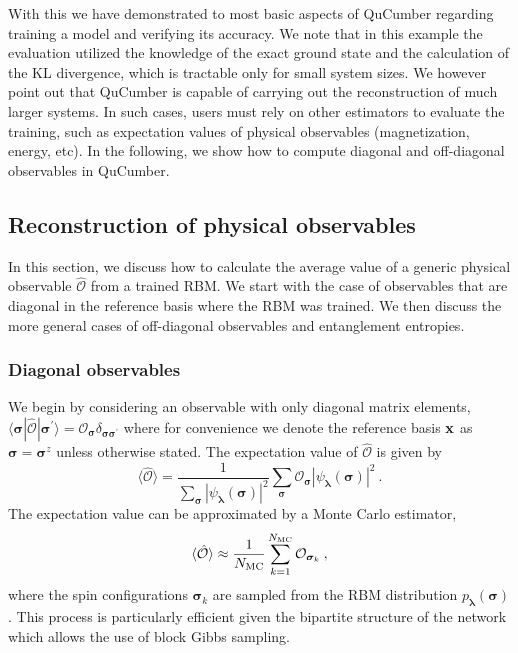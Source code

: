\documentclass[submission, Phys, hidelnks]{SciPost}
\begin{document}
With this we have demonstrated to most basic aspects of QuCumber regarding training a model and verifying its accuracy. We note that in this example the evaluation utilized the knowledge of the exact ground state and the calculation of the KL divergence, which is tractable only for small system sizes.  We however point out that QuCumber is capable of carrying out the reconstruction of much larger systems. In such cases, users must rely on other estimators to evaluate the training, such as 
expectation values of physical observables (magnetization, energy, etc).
In the following, we show how to compute diagonal and off-diagonal observables in QuCumber. 

\subsection{Reconstruction of physical observables} \label{Sec:Sampling_a-Trained_RBM}
In this section, we discuss how to calculate the average value of a generic physical observable $\hat{\mathcal{O}}$ from a trained RBM. We start with the case of observables that are diagonal in the reference basis where the RBM was trained. We then discuss the more general cases of off-diagonal observables and entanglement entropies.

\subsubsection{Diagonal observables}
We begin by considering an observable with only diagonal matrix elements,
$\langle\bm{\sigma}|\hat{\mathcal{O}}|\bm{\sigma}^{\prime}\rangle=\mathcal{O}_{\bm{\sigma}}\delta_{\bm{\sigma\sigma}^\prime}$ where for convenience we denote the reference basis ${\bf x}$ as $\bm{\sigma}=\bm{\sigma}^z$ unless otherwise stated.
The expectation value of $\hat{\mathcal{O}}$ is given by
\begin{equation}
    \langle \hat{\mathcal{O}} \rangle = \frac{1}{\sum_{\bm{\sigma}} |\psi_{\bm{\lambda}}(\bm{\sigma})|^2}
    \sum_{\bm{\sigma}} \mathcal{O}_{\bm{\sigma}}|\psi_{\bm{\lambda}}(\bm{\sigma})|^2\:.
\end{equation}
The expectation value can be approximated by a Monte Carlo estimator,
\begin{equation}
    \langle \hat{\mathcal{O}}\rangle \approx \frac{1}{N_{\rm MC}} \sum_{k=1}^{N_{\rm MC}} \mathcal{O}_{\bm{\sigma}_k}\:,
\end{equation}
where the spin configurations $\bm{\sigma}_k$ are sampled from the RBM distribution $p_{\bm{\lambda}}(\bm{\sigma})$. This process is particularly efficient given the bipartite structure of the network which allows the use of block Gibbs sampling. 
\end{document}
